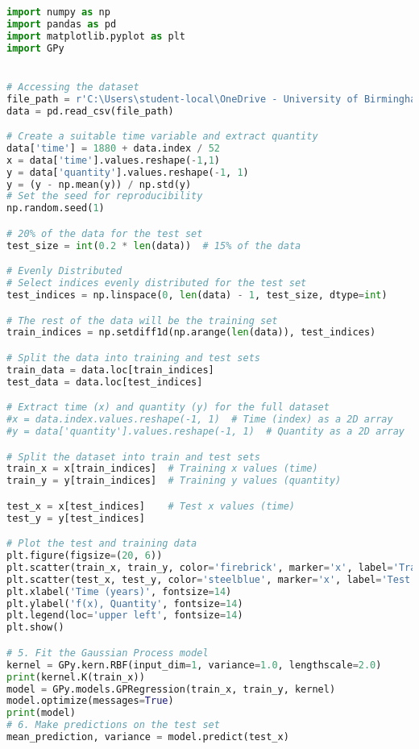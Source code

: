 \documentclass[12pt,a4paper]{article}
\begin{document}
\vspace{10pt}
\begin{lstlisting}[language=python, caption={Code of the Creation of Figures \ref{fig:SE dataset plot} and \ref{fig:SE GPregression}}]
import numpy as np
import pandas as pd
import matplotlib.pyplot as plt
import GPy


# Accessing the dataset
file_path = r'C:\Users\student-local\OneDrive - University of Birmingham\Dissertation\CartelStability.csv'
data = pd.read_csv(file_path)

# Create a suitable time variable and extract quantity
data['time'] = 1880 + data.index / 52
x = data['time'].values.reshape(-1,1)
y = data['quantity'].values.reshape(-1, 1)  
y = (y - np.mean(y)) / np.std(y)
# Set the seed for reproducibility
np.random.seed(1)

# 20% of the data for the test set
test_size = int(0.2 * len(data))  # 15% of the data

# Evenly Distributed
# Select indices evenly distributed for the test set
test_indices = np.linspace(0, len(data) - 1, test_size, dtype=int)

# The rest of the data will be the training set
train_indices = np.setdiff1d(np.arange(len(data)), test_indices)

# Split the data into training and test sets
train_data = data.loc[train_indices]
test_data = data.loc[test_indices]

# Extract time (x) and quantity (y) for the full dataset
#x = data.index.values.reshape(-1, 1)  # Time (index) as a 2D array
#y = data['quantity'].values.reshape(-1, 1)  # Quantity as a 2D array

# Split the dataset into train and test sets
train_x = x[train_indices]  # Training x values (time)
train_y = y[train_indices]  # Training y values (quantity)

test_x = x[test_indices]    # Test x values (time)
test_y = y[test_indices]

# Plot the test and training data
plt.figure(figsize=(20, 6))
plt.scatter(train_x, train_y, color='firebrick', marker='x', label='Training Data', s=70)
plt.scatter(test_x, test_y, color='steelblue', marker='x', label='Test Data', s=70)
plt.xlabel('Time (years)', fontsize=14)
plt.ylabel('f(x), Quantity', fontsize=14)
plt.legend(loc='upper left', fontsize=14)
plt.show()

# 5. Fit the Gaussian Process model
kernel = GPy.kern.RBF(input_dim=1, variance=1.0, lengthscale=2.0)
print(kernel.K(train_x))
model = GPy.models.GPRegression(train_x, train_y, kernel)
model.optimize(messages=True)
print(model)
# 6. Make predictions on the test set
mean_prediction, variance = model.predict(test_x)


\end{lstlisting}
\end{document}
